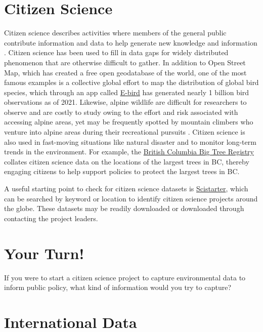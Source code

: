 \documentclass[
]{book}
\begin{document}
\hypertarget{citizen-science}{%
\section{Citizen Science}\label{citizen-science}}

Citizen science describes activities where members of the general public contribute information and data to help generate new knowledge and information \citep{lee_review_2020}. Citizen science has been used to fill in data gaps for widely distributed phenomenon that are otherwise difficult to gather. In addition to Open Street Map, which has created a free open geodatabase of the world, one of the most famous examples is a collective global effort to map the distribution of global bird species, which through an app called \href{https://ebird.org/home}{E-bird} has generated nearly 1 billion bird observations as of 2021. Likewise, alpine wildlife are difficult for researchers to observe and are costly to study owing to the effort and risk associated with accessing alpine areas, yet may be frequently spotted by mountain climbers who venture into alpine areas during their recreational pursuits \citep{jackson_citizen_2015}. Citizen science is also used in fast-moving situations like natural disaster and to monitor long-term trends in the environment. For example, the \href{https://bigtrees.forestry.ubc.ca/bc-bigtree-registry/}{British Columbia Big Tree Registry} collates citizen science data on the locations of the largest trees in BC, thereby engaging citizens to help support policies to protect the largest trees in BC.

A useful starting point to check for citizen science datasets is \href{https://scistarter.org/}{Scistarter}, which can be searched by keyword or location to identify citizen science projects around the globe. These datasets may be readily downloaded or downloaded through contacting the project leaders.

\hypertarget{your-turn-4}{%
\section*{Your Turn!}\label{your-turn-4}}

If you were to start a citizen science project to capture environmental data to inform public policy, what kind of information would you try to capture?

\hypertarget{international-data}{%
\section{International Data}\label{international-data}}
\end{document}
